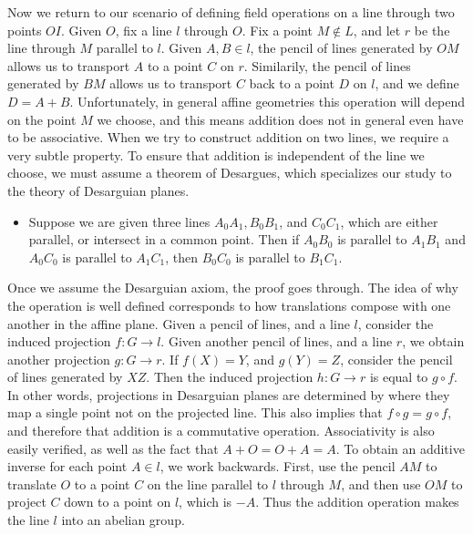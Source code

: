 Now we return to our scenario of defining field operations on a line through two points $OI$. Given $O$, fix a line $l$ through $O$. Fix a point $M \not \in L$, and let $r$ be the line through $M$ parallel to $l$. Given $A,B \in l$, the pencil of lines generated by $OM$ allows us to transport $A$ to a point $C$ on $r$. Similarily, the pencil of lines generated by $BM$ allows us to transport $C$ back to a point $D$ on $l$, and we define $D = A + B$. Unfortunately, in general affine geometries this operation will depend on the point $M$ we choose, and this means addition does not in general even have to be associative. When we try to construct addition on two lines, we require a very subtle property. To ensure that addition is independent of the line we choose, we must assume a theorem of Desargues, which specializes our study to the theory of Desarguian planes.
%
\begin{itemize}
    \item Suppose we are given three lines $A_0A_1, B_0B_1$, and $C_0C_1$, which are either parallel, or intersect in a common point. Then if $A_0B_0$ is parallel to $A_1B_1$ and $A_0C_0$ is parallel to $A_1C_1$, then $B_0C_0$ is parallel to $B_1C_1$.
\end{itemize}
%
Once we assume the Desarguian axiom, the proof goes through. The idea of why the operation is well defined corresponds to how translations compose with one another in the affine plane. Given a pencil of lines, and a line $l$, consider the induced projection $f: G \to l$. Given another pencil of lines, and a line $r$, we obtain another projection $g: G \to r$. If $f(X) = Y$, and $g(Y) = Z$, consider the pencil of lines generated by $XZ$. Then the induced projection $h: G \to r$ is equal to $g \circ f$. In other words, projections in Desarguian planes are determined by where they map a single point not on the projected line. This also implies that $f \circ g = g \circ f$, and therefore that addition is a commutative operation. Associativity is also easily verified, as well as the fact that $A + O = O + A = A$. To obtain an additive inverse for each point $A \in l$, we work backwards. First, use the pencil $AM$ to translate $O$ to a point $C$ on the line parallel to $l$ through $M$, and then use $OM$ to project $C$ down to a point on $l$, which is $-A$. Thus the addition operation makes the line $l$ into an abelian group.

